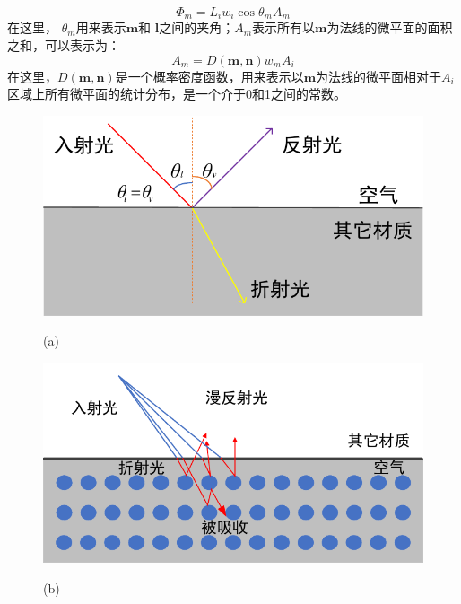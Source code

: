 \begin{equation}\label{eq:dphim}
  \Phi_{m}=L_{i}w_{i}\cos\theta_{m}A_{m}
\end{equation}
在这里， $\theta_{m}$用来表示$\mathbf{m}$和 $\mathbf{l}$之间的夹角；$A_{m}$表示所有以$\mathbf{m}$为法线的微平面的面积之和，可以表示为：
\begin{equation}\label{eq:dAm}
A_{m}=D(\mathbf{m},\mathbf{n})w_{m}A_{i}
\end{equation}
在这里，$D(\mathbf{m},\mathbf{n})$是一个概率密度函数，用来表示以$\mathbf{m}$为法线的微平面相对于$A_{i}$区域上所有微平面的统计分布，是一个介于0和1之间的常数。



\begin{figure}[!t]
\centering
  \begin{minipage}{0.45\linewidth}
    \centerline{\includegraphics[width=\textwidth]{FIG/reflect process1.pdf}}
    \centerline{(a)}
  \end{minipage}
  \begin{minipage}{0.45\linewidth}
    \centerline{\includegraphics[width=\textwidth]{FIG/reflect process2.pdf}}
    \centerline{(b)}
  \end{minipage}\\

\end{figure}

